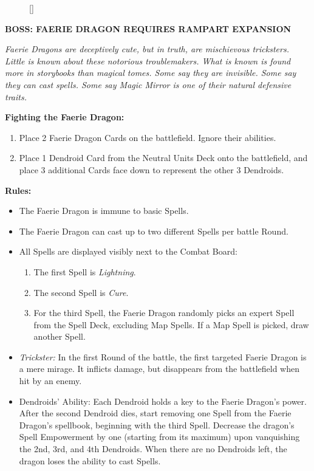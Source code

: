 \begin{figure}
  \raisebox{0pt}[\dimexpr{}\baselineskip\relax]{}
  \vspace*{\baselineskip}
\end{figure}
{
  \textbf{\MakeUppercase{Boss: Faerie Dragon {\scriptsize Requires Rampart Expansion}}}

  \medskip

  \textit{Faerie Dragons are deceptively cute, but in truth, are mischievous tricksters.
    Little is known about these notorious troublemakers.
    What is known is found more in storybooks than magical tomes.
    Some say they are invisible.
    Some say they can cast spells.
    Some say Magic Mirror is one of their natural defensive traits.
  }

  \medskip

  \textbf{Fighting the Faerie Dragon:}
  \begin{enumerate}
    \item Place 2 Faerie Dragon Cards on the battlefield.
      Ignore their abilities.
    \item Place 1 Dendroid Card from the  Neutral Units Deck onto the battlefield, and place 3 additional Cards face down to represent the other 3 Dendroids.
  \end{enumerate}

  \medskip

  \textbf{Rules:}
  \begin{itemize}
    \item The Faerie Dragon is immune to basic Spells.
    \item The Faerie Dragon can cast up to two different Spells per battle Round.
    \item All Spells are displayed visibly next to the Combat Board:
      \begin{enumerate}
        \item The first Spell is \textit{Lightning}.
        \item The second Spell is \textit{Cure}.
        \item For the third Spell, the Faerie Dragon randomly picks an expert Spell from the Spell Deck, excluding Map  Spells.
          If a Map  Spell is picked, draw another Spell.
      \end{enumerate}
    \item \textit{Trickster:} In the first Round of the battle, the first targeted Faerie Dragon is a mere mirage.
      It inflicts damage, but disappears from the battlefield when hit by an enemy.
    \item Dendroids' Ability: Each Dendroid holds a key to the Faerie Dragon's power.
      After the second Dendroid dies, start removing one Spell from the Faerie Dragon's spellbook, beginning with the third Spell.
      Decrease the dragon's Spell Empowerment  by one (starting from its maximum) upon vanquishing the 2nd, 3rd, and 4th Dendroids.
      When there are no Dendroids left, the dragon loses the ability to cast Spells.
  \end{itemize}
}

